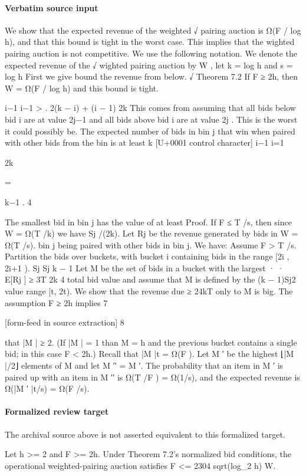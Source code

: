 \documentclass[10pt]{article}
\begin{document}
\paragraph{Verbatim source input}
\begin{ReviewVerbatim}
We show that the expected
revenue of the weighted
√
pairing auction is Ω(F / log h), and that this bound
is tight in the worst case. This implies that the
wighted pairing auction is not competitive.
We use the following notation. We denote the expected revenue of the √
wighted pairing auction by W ,
let k = log h and s = log h First we give bound the
revenue from below.
√
Theorem 7.2 If F ≥ 2h, then W = Ω(F / log h)
and this bound is tight.

i−1
i−1
>
.
2(k − i) + (i − 1)
2k
This comes from assuming that all bids below bid i
are at value 2j−1 and all bids above bid i are at value
2j . This is the worst it could possibly be. The expected number of bids in bin j that win when paired
with other bids from the bin is at least
k
[U+0001 control character]
i−1
i=1

2k

=

k−1
.
4

The smallest bid in bin j has the value of at least Proof. If F ≤ T /s, then since W = Ω(T /k) we have
Sj /(2k). Let Rj be the revenue generated by bids in W = Ω(T /s).
bin j being paired with other bids in bin j. We have:
Assume F > T /s. Partition the bids over buckets,
with bucket i containing bids in the range [2i , 2i+1 ).
Sj Sj k − 1
Let M be the set of bids in a bucket with the largest
·
·
E[Rj ] ≥
3T 2k
4
total bid value and assume that M is defined by the
(k − 1)Sj2
value range [t, 2t). We show that the revenue due
≥
24kT
only to M is big. The assumption F ≥ 2h implies
7


[form-feed in source extraction]
8

that |M | ≥ 2. (If |M | = 1 than M = {h} and the
previous bucket contains a single bid; in this case
F < 2h.) Recall that |M |t = Ω(F ). Let M ′ be the
highest ⌊|M |/2⌋ elements of M and let M ′′ = M \M ′.
The probability that an item in M ′ is paired up
with an item in M ′′ is Ω(T /F ) = Ω(1/s), and the
expected revenue is Ω(|M ′ |t/s) = Ω(F /s).
\end{ReviewVerbatim}


\paragraph{Formalized review target}
The archival source above is not asserted equivalent to this formalized target.
\begin{ReviewVerbatim}
Let h >= 2 and F >= 2h. Under Theorem 7.2's normalized bid conditions, the operational weighted-pairing auction satisfies F <= 2304 sqrt(log_2 h) W.
\end{ReviewVerbatim}
\end{document}
